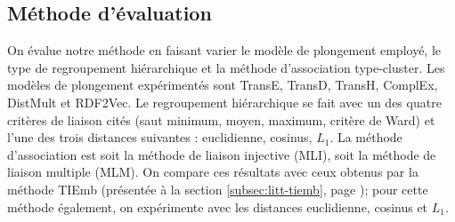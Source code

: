 



\subsection{Méthode d'évaluation}
\label{subsec:te-evaluation}

On évalue notre méthode en faisant varier le modèle de plongement employé, le type de regroupement hiérarchique et la méthode d'association type-cluster. Les modèles de plongement expérimentés sont TransE, TransD, TransH, ComplEx, DistMult et RDF2Vec. Le regroupement hiérarchique se fait avec un des quatre critères de liaison cités (saut minimum, moyen, maximum, critère de Ward) et l'une des trois distances suivantes : euclidienne, cosinus, $L_1$. %
La méthode d'association est soit la méthode de liaison injective (MLI), soit la méthode de liaison multiple (MLM). On compare ces résultats avec ceux obtenus par la méthode TIEmb \cite{ristoski2017large} (présentée à la section \ref{subsec:litt-tiemb}, page \pageref{subsec:litt-tiemb}); pour cette méthode également, on expérimente avec les distances euclidienne, cosinus et $L_1$. 

